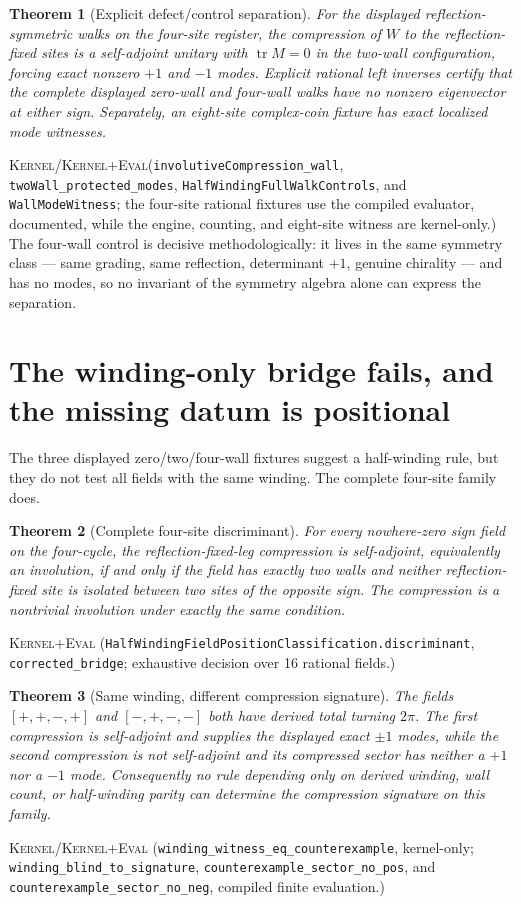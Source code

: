 \documentclass[11pt]{article}
\newcommand{\tr}{\operatorname{tr}}
\newcommand{\Kernel}{\textcolor{kernelcolor}{\textsc{Kernel}}}
\newcommand{\DraftTrust}{\textcolor{draftcolor}{\textsc{Kernel+Eval}}}
\newtheorem{theorem}{Theorem}
\begin{document}
\begin{theorem}[Explicit defect/control separation]\label{thm:halfwinding}
For the displayed reflection-symmetric walks on the four-site register, the
compression of $W$ to the reflection-fixed sites is a self-adjoint unitary
with $\tr M=0$ in the two-wall configuration, forcing exact nonzero $+1$
and $-1$ modes.  Explicit rational left inverses certify that the complete
displayed zero-wall and four-wall walks have no nonzero eigenvector at either
sign.  Separately, an eight-site complex-coin fixture has exact localized
mode witnesses.
\end{theorem}
\noindent\Kernel{}/\DraftTrust{}\quad(\texttt{involutiveCompression\_wall},
\texttt{twoWall\_protected\_modes},
\texttt{HalfWindingFullWalkControls}, and \texttt{WallModeWitness}; the
four-site rational fixtures use the compiled evaluator, documented, while the
engine, counting, and eight-site witness are kernel-only.)  The four-wall control is decisive
methodologically: it lives in the same symmetry class --- same grading,
same reflection, determinant $+1$, genuine chirality --- and has no modes,
so no invariant of the symmetry algebra alone can express the separation.

\section{The winding-only bridge fails, and the missing datum is positional}

The three displayed zero/two/four-wall fixtures suggest a half-winding rule,
but they do not test all fields with the same winding.  The complete four-site
family does.

\begin{theorem}[Complete four-site discriminant]\label{thm:position}
For every nowhere-zero sign field on the four-cycle, the reflection-fixed-leg
compression is self-adjoint, equivalently an involution, if and only if the
field has exactly two walls and neither reflection-fixed site is isolated
between two sites of the opposite sign.  The compression is a nontrivial
involution under exactly the same condition.
\end{theorem}
\noindent\DraftTrust{}\quad
(\texttt{HalfWindingFieldPositionClassification.discriminant},
\texttt{corrected\_bridge}; exhaustive decision over 16 rational fields.)

\begin{theorem}[Same winding, different compression signature]
The fields $[+,+,-,+]$ and $[-,+,-,-]$ both have derived total turning
$2\pi$.  The first compression is self-adjoint and supplies the displayed
exact $\pm1$ modes, while the second compression is not self-adjoint and its
compressed sector has neither a $+1$ nor a $-1$ mode.  Consequently no rule
depending only on derived winding, wall count, or half-winding parity can
determine the compression signature on this family.
\end{theorem}
\noindent\Kernel{}/\DraftTrust{}\quad
(\texttt{winding\_witness\_eq\_counterexample}, kernel-only;
\texttt{winding\_blind\_to\_signature},
\texttt{counterexample\_sector\_no\_pos}, and
\texttt{counterexample\_sector\_no\_neg}, compiled finite evaluation.)
\end{document}

